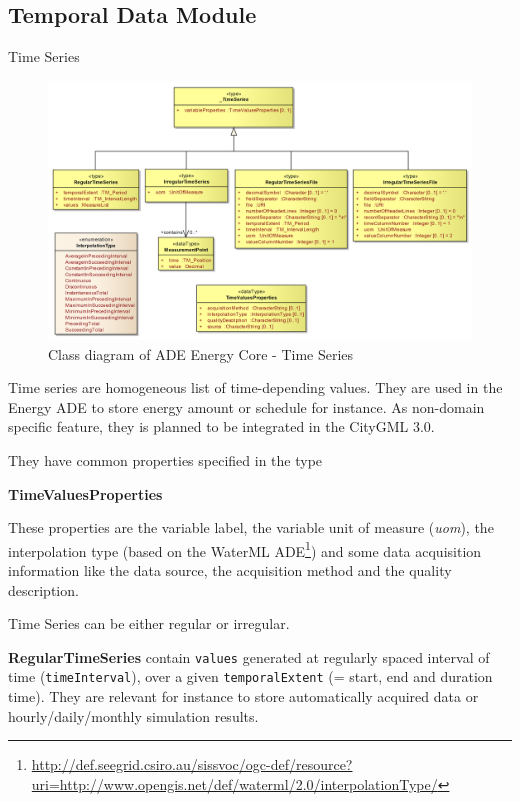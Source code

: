 \documentclass[a4paper,12pt]{article}
\renewcommand{\href}[2]{#2\footnote{\url{#1}}}
\begin{document}
\subsection{Temporal Data Module}\label{temporal-data-module}

Time Series

\begin{figure}[htbp]
\centering
\includegraphics{fig/class_time.png}
\caption{Class diagram of ADE Energy Core - Time Series}
\end{figure}

Time series are homogeneous list of time-depending values. They are used
in the Energy ADE to store energy amount or schedule for instance. As
non-domain specific feature, they is planned to be integrated in the
CityGML 3.0.

They have common properties specified in the type

\textbf{TimeValuesProperties}

These properties are the variable label, the variable unit of measure
(\emph{uom}), the interpolation type (based on the
\href{http://def.seegrid.csiro.au/sissvoc/ogc-def/resource?uri=http://www.opengis.net/def/waterml/2.0/interpolationType/}{WaterML
ADE}) and some data acquisition information like the data source, the
acquisition method and the quality description.

Time Series can be either regular or irregular.

\textbf{RegularTimeSeries} contain \texttt{values} generated at
regularly spaced interval of time (\texttt{timeInterval}), over a given
\texttt{temporalExtent} (= start, end and duration time). They are
relevant for instance to store automatically acquired data or
hourly/daily/monthly simulation results.
\end{document}
